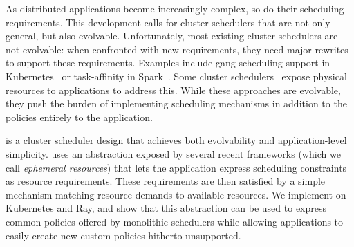 As distributed applications become increasingly complex, so do their scheduling requirements. This development calls for cluster schedulers that are not only general, but also evolvable. Unfortunately, most existing cluster schedulers are not evolvable: when confronted with new requirements, they need major rewrites to support these requirements. Examples include gang-scheduling support in Kubernetes~\cite{spark-ganscheduling, kubernetes} or task-affinity in Spark~\cite{spark-ganscheduling}. Some cluster schedulers~\cite{omega,mesos} expose physical resources to applications to address this. While these approaches are evolvable, they push the burden of implementing scheduling mechanisms in addition to the policies entirely to the application.

\name{} is a cluster scheduler design that achieves both evolvability and application-level simplicity. \name{} uses an abstraction exposed by several recent frameworks (which we call \textit{ephemeral resources}) that lets the application express scheduling constraints as resource requirements. These requirements are then satisfied by a simple mechanism matching resource demands to available resources. We implement \name{} on Kubernetes and Ray, and show that this abstraction can be used to express common policies offered by monolithic schedulers while allowing applications to easily create new custom policies hitherto unsupported.